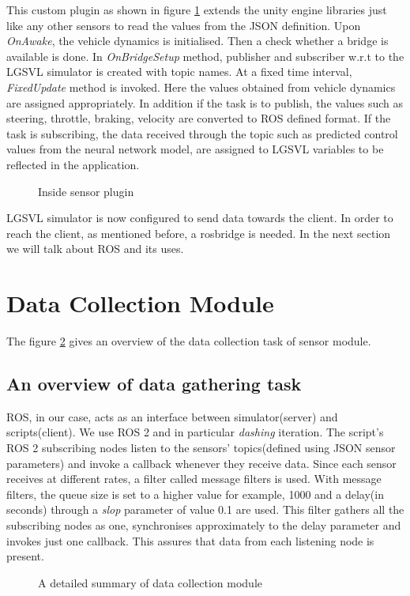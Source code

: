 This custom plugin as shown in figure \ref{fig:lgsvlsensorplugin} extends the unity engine libraries just like
any other sensors to read the values from the JSON definition. Upon \textit{OnAwake}, the
vehicle dynamics is initialised. Then a check whether a bridge is available is done. In
\textit{OnBridgeSetup} method, publisher and subscriber w.r.t to the LGSVL simulator is
created with topic names. At a fixed time interval, \textit{FixedUpdate} method is invoked.
Here the values obtained from vehicle dynamics are assigned appropriately. In addition if
the task is to publish, the values such as steering, throttle, braking, velocity are converted to ROS defined format. If the task is
subscribing, the data received through the topic such as predicted control values from the
neural network model, are assigned to LGSVL variables to be
reflected in the application.

\begin{figure}
	\centering
    \def\svgwidth{\textwidth}
    \caption{Inside sensor plugin}
    \label{fig:lgsvlsensorplugin}
\end{figure}
LGSVL simulator is now configured to send data towards the client. In order to reach the
client, as mentioned before, a rosbridge is needed. In the next section we will talk
about ROS and its uses.

\section{Data Collection Module}
The figure \ref{fig:datacollectionmodule} gives an overview of the data collection task of
sensor module.

\subsection{An overview of data gathering task}
ROS, in our case, acts as an interface between simulator(server) and scripts(client).
We use ROS 2 and in particular \textit{dashing} iteration.
The script's ROS 2 subscribing nodes listen to the sensors' topics(defined using JSON
sensor parameters) and invoke a callback whenever they receive data. Since each sensor receives at different rates, a
filter called message filters is used. With message filters, the queue size is set to a
higher value for example, 1000 and a delay(in seconds) through a \textit{slop} parameter of value
0.1 are used. This filter gathers all the subscribing nodes as one, synchronises
approximately to the delay parameter and invokes just one callback. This assures that data
from each listening node is present.
\begin{figure}
	\centering
    \def\svgwidth{\textwidth}
    \caption{A detailed summary of data collection module}
    \label{fig:datacollectionmodule}
\end{figure}

